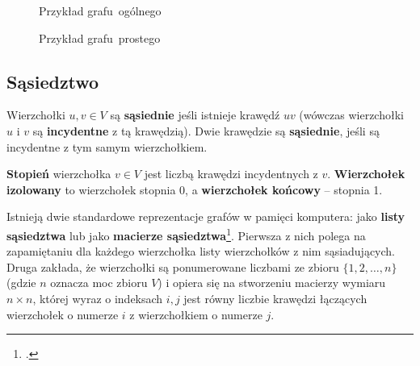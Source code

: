 \begin{figure}[h]
\centering
\begin{minipage}{.45\textwidth}
  \centering
\captionsetup{justification=centering}
\caption{Przykład grafu~ogólnego} \label{fig:simple-graph}
\end{minipage}
\begin{minipage}{.45\textwidth}
  \centering
\captionsetup{justification=centering}
\caption{Przykład grafu~prostego} \label{fig:graph}
\end{minipage}
\end{figure}

\subsection*{Sąsiedztwo}

Wierzchołki $u,v \in V$ są \textbf{sąsiednie} jeśli istnieje krawędź $uv$ (wówczas wierzchołki $u$ i $v$ są \textbf{incydentne} z tą krawędzią). Dwie krawędzie są \textbf{sąsiednie}, jeśli są incydentne z tym samym wierzchołkiem. 

\textbf{Stopień} wierzchołka $v \in V$ jest liczbą krawędzi incydentnych z $v$. \textbf{Wierzchołek izolowany} to wierzchołek stopnia 0, a \textbf{wierzchołek końcowy} -- stopnia 1.

Istnieją dwie standardowe reprezentacje grafów w pamięci komputera: jako \textbf{listy sąsiedztwa} lub jako \textbf{macierze sąsiedztwa}\footcites[29]{banachowski}[600]{cormen}. Pierwsza z nich polega na zapamiętaniu dla każdego wierzchołka listy wierzchołków z nim sąsiadujących. Druga zakłada, że wierzchołki są ponumerowane liczbami ze zbioru $\{1, 2,\ldots,n\}$ (gdzie $n$ oznacza moc zbioru $V$) i opiera się na stworzeniu macierzy wymiaru $n \times n$, której wyraz o indeksach $i,j$ jest równy liczbie krawędzi łączących wierzchołek o numerze $i$ z wierzchołkiem o numerze $j$.

